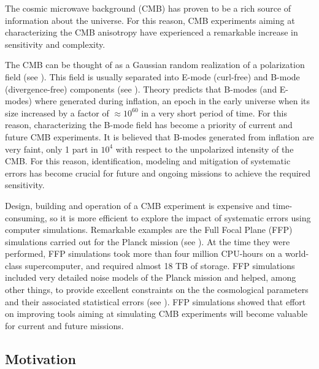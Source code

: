 \documentclass[a4paper,fleqn]{cas-dc}\sloppy
\begin{document}
The cosmic microwave background (CMB) has proven to be a rich source of information about the universe. For this reason, CMB experiments aiming at characterizing the CMB anisotropy have experienced a remarkable increase in sensitivity and complexity. 

The CMB can be thought of as a Gaussian random realization of a polarization field (see \cite{1997PhRvD..55.7368K, 1960ratr.book.....C}). This field is usually separated into E-mode (curl-free) and B-mode (divergence-free) components (see \cite{1997PhRvD..55.1830Z}). Theory predicts that B-modes (and E-modes) where generated during inflation, an epoch in the early universe when its size increased by a factor of $\approx 10^{60}$ in a very short period of time. For this reason, characterizing the B-mode field has become a priority of current and future CMB experiments. It is believed that B-modes generated from inflation are very faint, only 1 part in $10^{4}$ with respect to the unpolarized intensity of the CMB. For this reason, identification, modeling and mitigation of systematic errors has become crucial for future and ongoing missions to achieve the required sensitivity. 

Design, building and operation of a CMB experiment is expensive and time-consuming, so it is more efficient to explore the impact of systematic errors using computer simulations. Remarkable examples are the Full Focal Plane (FFP) simulations carried out for the Planck mission (see \cite{2016A&A...594A..12P}). At the time they were performed, FFP simulations took more than four million CPU-hours on a world-class supercomputer, and required almost 18 TB of storage. FFP simulations included very detailed noise models of the Planck mission and helped, among other things, to provide excellent constraints on the the cosmological parameters and their associated statistical errors (see \cite{2016A&A...594A..13P}). FFP simulations showed that effort on improving tools aiming at simulating CMB experiments will become valuable for current and future missions.

\subsection{Motivation}
\end{document}
